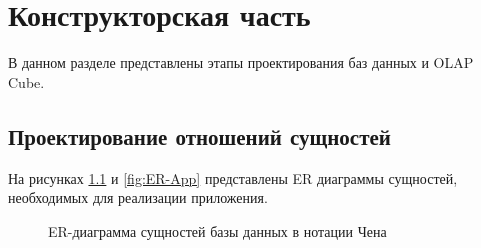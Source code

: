 \chapter{Конструкторская часть}

В данном разделе представлены этапы проектирования баз данных и OLAP Cube.

\section{Проектирование отношений сущностей}

На рисунках \ref{fig:ER-Chen} и \ref{fig:ER-App} представлены ER диаграммы сущностей, необходимых для реализации приложения.

\newpage

\begin{figure}[!h]
	\caption{ER-диаграмма сущностей базы данных в нотации Чена}
	\label{fig:ER-Chen}
\end{figure}

